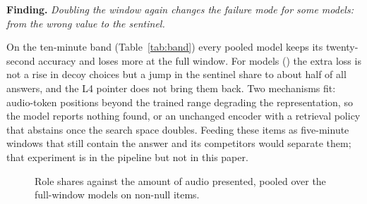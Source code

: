 \documentclass{article}
\newcommand{\finding}[1]{\par\smallskip\noindent\textbf{Finding.} \emph{#1}\par\smallskip}
\begin{document}
\finding{Doubling the window again changes the failure mode for some
models: from the wrong value to the sentinel.}
On the ten-minute band (Table~\ref{tab:band}) every pooled model keeps its
twenty-second accuracy and loses more at the full window. For
\NbandSwitch{} models (\bandSwitchNames{}) the extra loss is not a rise in
decoy choices but a jump in the sentinel share to about half of all
answers, and the L4 pointer does not bring them back. Two mechanisms fit:
audio-token positions beyond the trained range degrading the representation,
so the model reports nothing found, or an unchanged encoder with a retrieval
policy that abstains once the search space doubles. Feeding these items as
five-minute windows that still contain the answer and its competitors would
separate them; that experiment is in the pipeline but not in this paper.

\begin{figure}[t]
\centering
{}
\caption{Role shares against the amount of audio presented, pooled over the
full-window models on non-null items.}
\label{fig:len}
\vspace{-6pt}
\end{figure}
\end{document}
